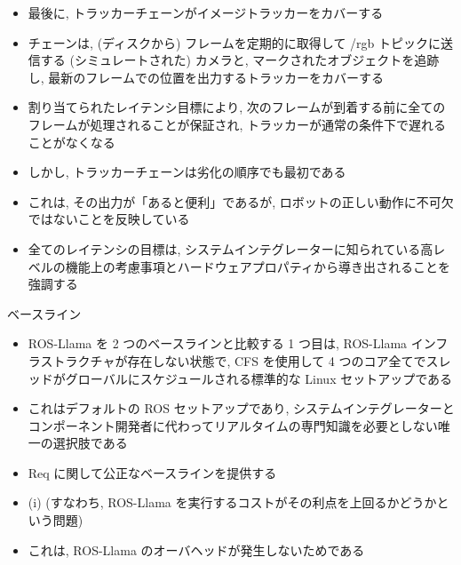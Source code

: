 \begin{frame}{}
    \begin{itemize}
        \item 最後に, トラッカーチェーンがイメージトラッカーをカバーする
\item チェーンは, (ディスクから) フレームを定期的に取得して /rgb トピックに送信する (シミュレートされた) カメラと, マークされたオブジェクトを追跡し, 最新のフレームでの位置を出力するトラッカーをカバーする
\item 割り当てられたレイテンシ目標により, 次のフレームが到着する前に全てのフレームが処理されることが保証され, トラッカーが通常の条件下で遅れることがなくなる
\item しかし, トラッカーチェーンは劣化の順序でも最初である
\item これは, その出力が「あると便利」であるが, ロボットの正しい動作に不可欠ではないことを反映している
    \end{itemize}
\end{frame}

\begin{frame}{}
    \begin{itemize}
        \item 全てのレイテンシの目標は, システムインテグレーターに知られている高レベルの機能上の考慮事項とハードウェアプロパティから導き出されることを強調する
    \end{itemize}
\end{frame}

\begin{frame}{ベースライン}
    \begin{itemize}
        \item ROS-Llama を 2 つのベースラインと比較する 1 つ目は, ROS-Llama インフラストラクチャが存在しない状態で, CFS を使用して 4 つのコア全てでスレッドがグローバルにスケジュールされる標準的な Linux セットアップである
\item これはデフォルトの ROS セットアップであり, システムインテグレーターとコンポーネント開発者に代わってリアルタイムの専門知識を必要としない唯一の選択肢である
\item Req に関して公正なベースラインを提供する
\item (i) (すなわち, ROS-Llama を実行するコストがその利点を上回るかどうかという問題)
\item これは, ROS-Llama のオーバヘッドが発生しないためである
    \end{itemize}
\end{frame}

